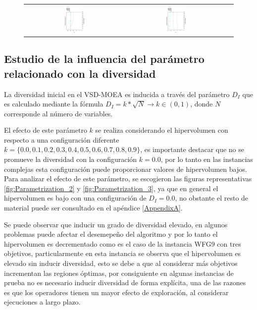 \begin{figure}[H]
\begin{tabular}{ccc}
    \includegraphics[width=0.2\textwidth, angle=-90,origin=c]{Figures_Chapter7/Results_Chapter3/WFG2_3obj_Scalability.eps} &
    \includegraphics[width=0.2\textwidth, angle=-90,origin=c]{Figures_Chapter7/Results_Chapter3/WFG8_3obj_Scalability.eps}  
\end{tabular}
\end{figure}

\subsection{Estudio de la influencia del parámetro relacionado con la diversidad}

La diversidad inicial en el VSD-MOEA es inducida a través del parámetro $D_I$ que es calculado mediante la fórmula $D_I = k * \sqrt{N} \rightarrow k \in (0,1)$, donde $N$ corresponde al número de variables.
%

El efecto de este parámetro $k$ se realiza considerando el hipervolumen con respecto a una configuración diferente $k = \{0.0, 0.1, 0.2, 0.3, 0.4, 0.5, 0.6, 0.7, 0.8, 0.9  \}$, es importante destacar que no se promueve la diversidad con la configuración $k=0.0$, por lo tanto en las instancias complejas esta configuración puede proporcionar valores de hipervolumen bajos.
%
Para analizar el efecto de este parámetro, se escogieron las figuras representativas \ref{fig:Parametrization_2} y \ref{fig:Parametrization_3}, ya que en general el hipervolumen es bajo con una configuración de $D_I = 0.0$, no obstante el resto de material puede ser consultado en el apéndice \ref{AppendixA}.
%

Se puede observar que inducir un grado de diversidad elevado, en algunos problemas puede afectar el desemepeño del algoritmo y por lo tanto el hipervolumen es decrementado como es el caso de la instancia WFG9 con tres objetivos, particularmente en esta instancia se observa que el hipervolumen es elevado sin inducir diversidad, esto se debe a que al considerar más objetivos incrementan las regiones óptimas, por consiguiente en algunas instancias de prueba no es necesario inducir diversidad de forma explícita, una de las razones es que los operadores tienen un mayor efecto de exploración, al considerar ejecuciones a largo plazo.
%


